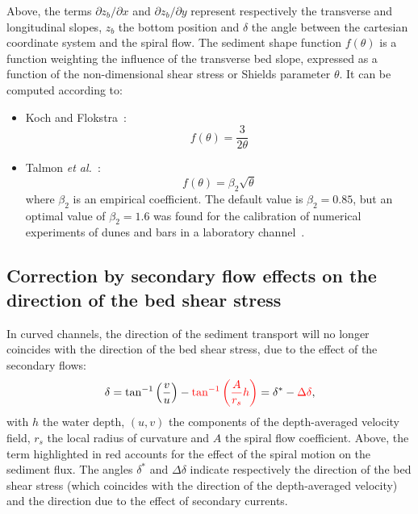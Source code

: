 Above, the terms $\partial z_b/\partial x$ and $\partial z_b/\partial y$ represent respectively the transverse and longitudinal slopes, $z_b$ the bottom position and $\delta$ the angle
between the cartesian coordinate system and the spiral flow. The sediment shape function $f(\theta)$ is a function weighting the influence of the transverse bed slope, expressed as a function of the non-dimensional shear stress or Shields parameter $\theta$. It can be computed according to:

\begin{itemize}
\item Koch and Flokstra~\cite{KochFlokstra80}:
\begin{equation*}
f(\theta) = \frac{3}{2\theta}
\end{equation*}
\item Talmon \textit{et al.}~\cite{Talmon95}:
\begin{equation*}
f(\theta) = \beta_2\sqrt{\theta}
\end{equation*}
where $\beta_2$ is an empirical coefficient. The default value is $\beta_2=0.85$, but an optimal value of $\beta_2=1.6$ was found for the calibration of numerical experiments of dunes and bars in a laboratory channel~\cite{Mendoza15}.
\end{itemize}

\subsection{Correction by secondary flow effects on the direction of the bed shear stress}
In curved channels, the direction of the sediment transport will no longer coincides with the direction of the bed shear stress,
due to the effect of the secondary flows:
\begin{equation}\label{eq:delta}
\delta = \tan^{-1}\left(\frac{v}{u}\right) - \textcolor{red}{\tan^{-1}\left(\frac{A}{r_s}h\right)} = \delta^* - \textcolor{red}{\Delta\delta},
\end{equation}
with $h$ the water depth, $(u,v)$ the components of the depth-averaged velocity field, $r_s$ the local radius of curvature and $A$ the spiral flow coefficient. Above, the term highlighted in red accounts for the effect of the spiral motion on the sediment flux. The angles $\delta^*$ and $\Delta\delta$ indicate respectively the direction of the bed shear stress (which coincides with the direction of the depth-averaged velocity) and the direction due to the effect of secondary currents.

